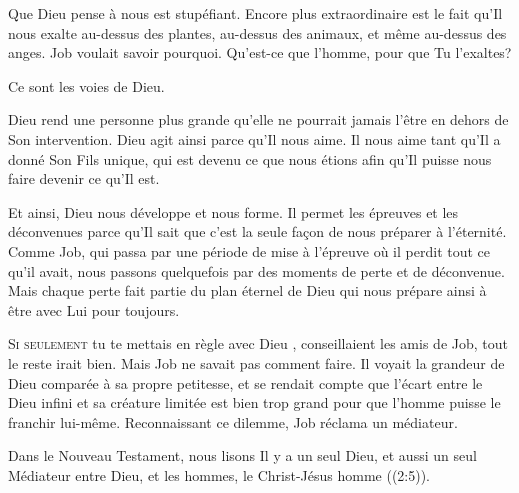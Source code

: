 Que Dieu pense à nous est stupéfiant. Encore plus extraordinaire
 est le fait qu'Il nous exalte \ocadr{}au-dessus des plantes,
 au-dessus des animaux, et même au-dessus des anges.
 Job voulait savoir pourquoi.
 \Og Qu'est-ce que l'homme, pour que Tu l'exaltes? \Fg{}

Ce sont les voies de Dieu.


Dieu rend une personne plus grande qu'elle ne pourrait jamais l'être
 en dehors de Son intervention.
 Dieu agit ainsi parce qu'Il nous aime.
 Il nous aime tant qu'Il a donné Son Fils unique,
 qui est devenu ce que nous étions afin qu'Il puisse
 nous faire devenir ce qu'Il est.

Et ainsi, Dieu nous développe et nous forme.
 Il permet les épreuves et les déconvenues parce qu'Il sait
 que c'est la seule fa\c{c}on de nous préparer à l'éternité.
 Comme Job, qui passa par une période de mise à l'épreuve
 où il perdit tout ce qu'il avait, nous passons quelquefois
 par des moments de perte et de déconvenue.
 Mais chaque perte fait partie du plan éternel de Dieu
 qui nous prépare ainsi à être avec Lui pour toujours. 

\dvrule






\lettrine[ante=\Og]{S}{i seulement} tu te mettais en règle avec Dieu \Fg{},
 conseillaient les amis de Job, \Og tout le reste irait bien. \Fg{}
 Mais Job ne savait pas comment faire.
 Il voyait la grandeur de Dieu comparée à sa propre petitesse,
 et se rendait compte que l'écart entre le Dieu infini
 et sa créature limitée est bien trop grand pour que l'homme
 puisse le franchir lui-même.
 Reconnaissant ce dilemme, Job réclama un médiateur.

Dans le Nouveau Testament, nous lisons \Og Il y a un seul Dieu,
 et aussi un seul Médiateur entre Dieu, et les hommes,
 le Christ-Jésus homme \Fg{} ((2:5)).

